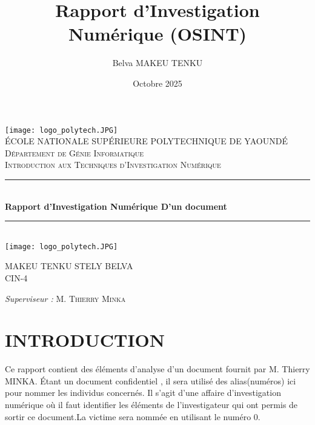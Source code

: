 \documentclass[a4paper,12pt]{report}
\title{Rapport d'Investigation Numérique (OSINT)}
\author{Belva MAKEU TENKU}
\date{Octobre 2025}
\newcommand{\HRule}{\rule{\linewidth}{0.5mm}}
\begin{document}
\begin{titlepage}
	\begin{sffamily}
		\begin{center}
			\texttt{[image: logo\_polytech.JPG]}~\\[1.5cm]
			\textsc{\LARGE ÉCOLE NATIONALE SUPÉRIEURE POLYTECHNIQUE DE YAOUNDÉ}\\[2cm]
			\textsc{\Large Département de Génie Informatique}\\[2cm]
			\textsc{\large Introduction aux Techniques d'Investigation Numérique}\\[1.5cm]
			\HRule \\[0.4cm]
			{ \huge \bfseries Rapport d'Investigation Numérique D'un document\\[0.4cm] }
			\HRule \\[2cm]
			\texttt{[image: logo\_polytech.JPG]} \\[2cm]
			\begin{minipage}{0.4\textwidth}
				\begin{flushleft} \large
					MAKEU TENKU STELY BELVA\\
					CIN-4\\
				\end{flushleft}
			\end{minipage}
			\begin{minipage}{0.4\textwidth}
				\begin{flushright} \large
					\emph{Superviseur :} M. \textsc{Thierry Minka}\\
				\end{flushright}
			\end{minipage}
			\vfill
		\end{center}
	\end{sffamily}
\end{titlepage}


\section{INTRODUCTION}
Ce rapport contient des éléments d'analyse d'un document fournit par M. Thierry MINKA. Étant un document confidentiel , il sera utilisé des alias(numéros) ici pour nommer les individus concernés. Il s'agit d'une affaire d'investigation numérique où il faut identifier les éléments de l'investigateur qui ont permis de sortir ce document.La victime sera nommée en utilisant le numéro 0.
\newpage
\end{document}
